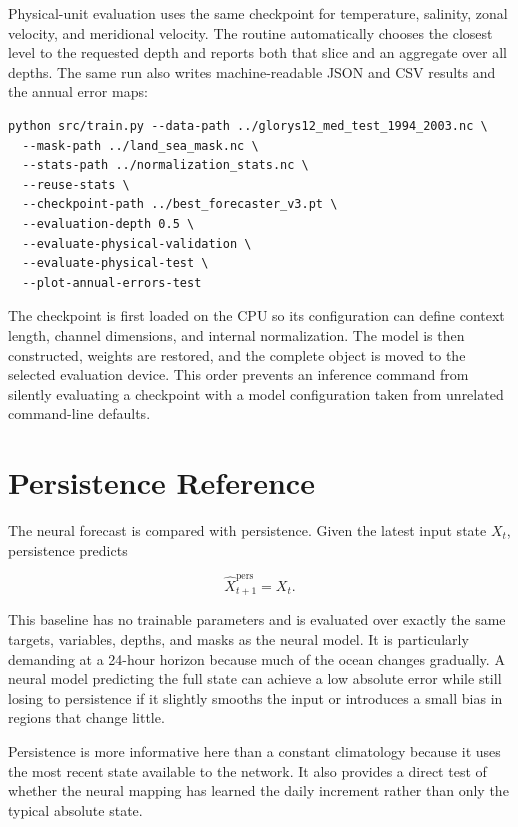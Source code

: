 Physical-unit evaluation uses the same checkpoint for temperature, salinity, zonal velocity, and meridional velocity. The routine automatically chooses the closest level to the requested depth and reports both that slice and an aggregate over all depths. The same run also writes machine-readable JSON and CSV results and the annual error maps:

\begin{lstlisting}[caption={Annual physical-unit multivariable evaluation.}]
python src/train.py --data-path ../glorys12_med_test_1994_2003.nc \
  --mask-path ../land_sea_mask.nc \
  --stats-path ../normalization_stats.nc \
  --reuse-stats \
  --checkpoint-path ../best_forecaster_v3.pt \
  --evaluation-depth 0.5 \
  --evaluate-physical-validation \
  --evaluate-physical-test \
  --plot-annual-errors-test
\end{lstlisting}

The checkpoint is first loaded on the CPU so its configuration can define context length, channel dimensions, and internal normalization. The model is then constructed, weights are restored, and the complete object is moved to the selected evaluation device. This order prevents an inference command from silently evaluating a checkpoint with a model configuration taken from unrelated command-line defaults.

\section{Persistence Reference}

The neural forecast is compared with persistence. Given the latest input state $X_t$, persistence predicts

\[
\widehat{X}^{\mathrm{pers}}_{t+1}=X_t.
\]

This baseline has no trainable parameters and is evaluated over exactly the same targets, variables, depths, and masks as the neural model. It is particularly demanding at a 24-hour horizon because much of the ocean changes gradually. A neural model predicting the full state can achieve a low absolute error while still losing to persistence if it slightly smooths the input or introduces a small bias in regions that change little.

Persistence is more informative here than a constant climatology because it uses the most recent state available to the network. It also provides a direct test of whether the neural mapping has learned the daily increment rather than only the typical absolute state.

